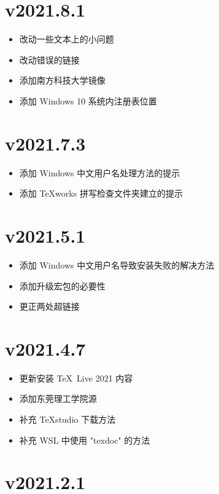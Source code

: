 \section*{v2021.8.1}

\begin{itemize}
  \item 改动一些文本上的小问题
  \item 改动错误的链接
  \item 添加南方科技大学镜像
  \item 添加 Windows 10 系统内注册表位置
\end{itemize}

\section*{v2021.7.3}

\begin{itemize}
  \item 添加 Windows 中文用户名处理方法的提示
  \item 添加 \TeX works 拼写检查文件夹建立的提示
\end{itemize}

\section*{v2021.5.1}

\begin{itemize}
  \item 添加 Windows 中文用户名导致安装失败的解决方法
  \item 添加升级宏包的必要性
  \item 更正两处超链接
\end{itemize}

\section*{v2021.4.7}

\begin{itemize}
  \item 更新安装 \TeX\ Live 2021 内容
  \item 添加东莞理工学院源
  \item 补充 \TeX studio 下载方法
  \item 补充 WSL 中使用 "texdoc" 的方法
\end{itemize}

\section*{v2021.2.1}

